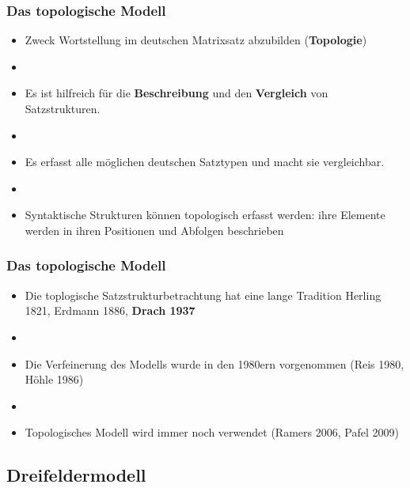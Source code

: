 \begin{frame}
\frametitle{Das topologische Modell}

\begin{itemize}

	\item Zweck \ras Wortstellung im deutschen Matrixsatz abzubilden (\textbf{Topologie})
	\item[]
	\item Es ist hilfreich für die \textbf{Beschreibung} und den \textbf{Vergleich} von Satzstrukturen.
	\item[]
	\item Es erfasst alle möglichen deutschen Satztypen und macht sie vergleichbar.
	\item[]
	\item Syntaktische Strukturen können topologisch erfasst werden: ihre Elemente werden in ihren Positionen und Abfolgen beschrieben

\end{itemize}

\end{frame}


\begin{frame}
\frametitle{Das topologische Modell}

\begin{itemize}
	\item Die toplogische Satzstrukturbetrachtung hat eine lange Tradition \ras Herling 1821, Erdmann 1886, \textbf{Drach 1937}
	\item[]
	\item Die Verfeinerung des Modells wurde in den 1980ern vorgenommen (Reis 1980, Höhle 1986)
	\item[]
	\item Topologisches Modell wird immer noch verwendet (Ramers 2006, Pafel 2009) 


\end{itemize}

\end{frame}


\subsection{Dreifeldermodell}


